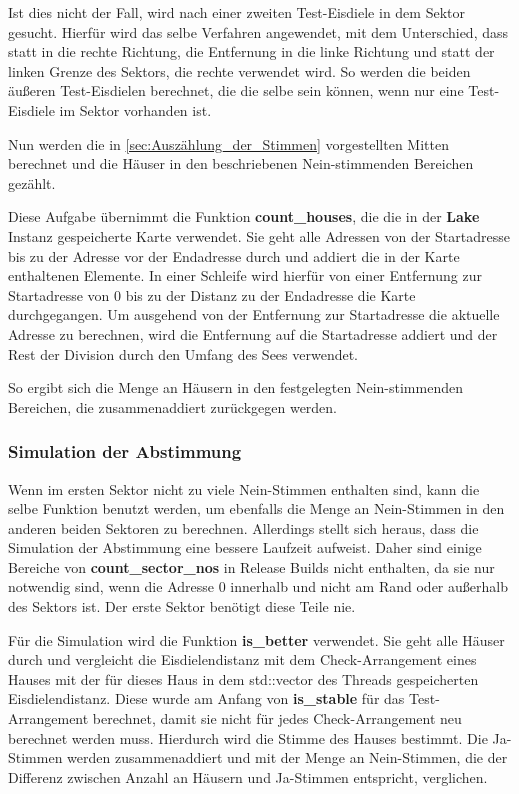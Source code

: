\documentclass[a4paper,10pt,ngerman,captions=figureheading]{scrartcl}
\begin{document}
Ist dies nicht der Fall, wird nach einer zweiten Test-Eisdiele in dem Sektor gesucht.
Hierfür wird das selbe Verfahren angewendet, mit dem Unterschied, dass statt in die rechte Richtung, die Entfernung in die linke Richtung und statt der linken Grenze des Sektors, die rechte verwendet wird.
So werden die beiden äußeren Test-Eisdielen berechnet, die die selbe sein können, wenn nur eine Test-Eisdiele im Sektor vorhanden ist.

\medskip
Nun werden die in \autoref{sec:Auszählung_der_Stimmen} vorgestellten Mitten berechnet und die Häuser in den beschriebenen Nein-stimmenden Bereichen gezählt.

\medskip
\begin{addmargin}[3em]{4em}
    Diese Aufgabe übernimmt die Funktion \textbf{count\_houses}, die die in der \textbf{Lake} Instanz gespeicherte Karte verwendet.
    Sie geht alle Adressen von der Startadresse bis zu der Adresse vor der Endadresse durch und addiert die in der Karte enthaltenen Elemente.
    In einer Schleife wird hierfür von einer Entfernung zur Startadresse von $0$ bis zu der Distanz zu der Endadresse die Karte durchgegangen.
    Um ausgehend von der Entfernung zur Startadresse die aktuelle Adresse zu berechnen, wird die Entfernung auf die Startadresse addiert und der Rest der Division durch den Umfang des Sees verwendet.
\end{addmargin}

\medskip
So ergibt sich die Menge an Häusern in den festgelegten Nein-stimmenden Bereichen, die zusammenaddiert zurückgegen werden.

\subsubsection{Simulation der Abstimmung}
Wenn im ersten Sektor nicht zu viele Nein-Stimmen enthalten sind, kann die selbe Funktion benutzt werden, um ebenfalls die Menge an Nein-Stimmen in den anderen beiden Sektoren zu berechnen.
Allerdings stellt sich heraus, dass die Simulation der Abstimmung eine bessere Laufzeit aufweist.
Daher sind einige Bereiche von \textbf{count\_sector\_nos} in Release Builds nicht enthalten, da sie nur notwendig sind, wenn die Adresse $0$ innerhalb und nicht am Rand oder außerhalb des Sektors ist.
Der erste Sektor benötigt diese Teile nie.

Für die Simulation wird die Funktion \textbf{is\_better} verwendet.
Sie geht alle Häuser durch und vergleicht die Eisdielendistanz mit dem Check-Arrangement eines Hauses mit der für dieses Haus in dem std::vector des Threads gespeicherten Eisdielendistanz.
Diese wurde am Anfang von \textbf{is\_stable} für das Test-Arrangement berechnet, damit sie nicht für jedes Check-Arrangement neu berechnet werden muss.
Hierdurch wird die Stimme des Hauses bestimmt.
Die Ja-Stimmen werden zusammenaddiert und mit der Menge an Nein-Stimmen, die der Differenz zwischen Anzahl an Häusern und Ja-Stimmen entspricht, verglichen.
\end{document}

